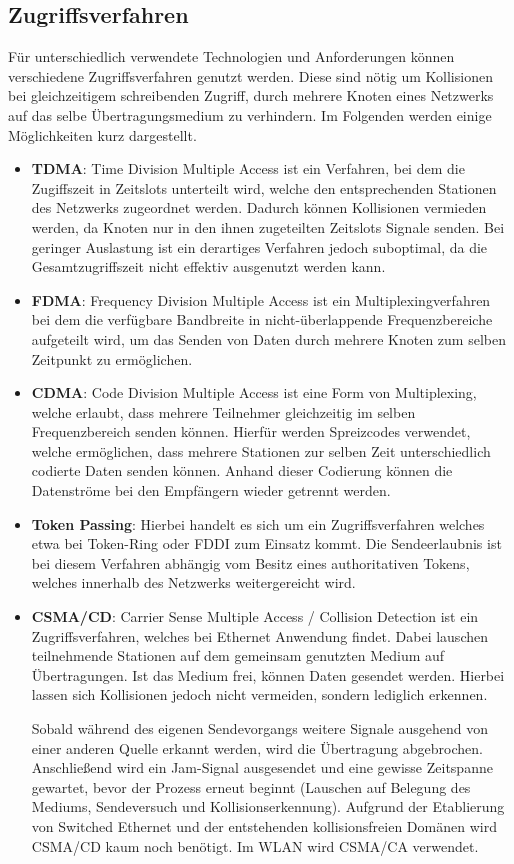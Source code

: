     \subsection{Zugriffsverfahren}
    Für unterschiedlich verwendete Technologien und Anforderungen können verschiedene Zugriffsverfahren genutzt werden. Diese sind nötig um Kollisionen bei gleichzeitigem
    schreibenden Zugriff, durch mehrere Knoten eines Netzwerks auf das selbe Übertragungsmedium zu verhindern. Im Folgenden werden einige Möglichkeiten kurz dargestellt.
        \begin{itemize}
            \item \textbf{TDMA}: Time Division Multiple Access ist ein Verfahren, bei dem die Zugiffszeit in Zeitslots unterteilt wird, welche den entsprechenden
            Stationen des Netzwerks zugeordnet werden. Dadurch können Kollisionen vermieden werden, da Knoten nur in den ihnen zugeteilten Zeitslots Signale 
            senden. Bei geringer Auslastung ist ein derartiges Verfahren jedoch suboptimal, da die Gesamtzugriffszeit nicht effektiv ausgenutzt werden kann.
            \item \textbf{FDMA}: Frequency Division Multiple Access ist ein Multiplexingverfahren bei dem die verfügbare Bandbreite in nicht-überlappende Frequenzbereiche aufgeteilt wird,
            um das Senden von Daten durch mehrere Knoten zum selben Zeitpunkt zu ermöglichen.
            \item \textbf{CDMA}: Code Division Multiple Access ist eine Form von Multiplexing, welche erlaubt, dass mehrere Teilnehmer gleichzeitig im selben Frequenzbereich
            senden können. Hierfür werden Spreizcodes verwendet, welche ermöglichen, dass mehrere Stationen zur selben Zeit unterschiedlich codierte Daten senden können.
            Anhand dieser Codierung können die Datenströme bei den Empfängern wieder getrennt werden.
            \item \textbf{Token Passing}: Hierbei handelt es sich um ein Zugriffsverfahren welches etwa bei Token-Ring oder FDDI zum Einsatz kommt. Die Sendeerlaubnis ist bei diesem
            Verfahren abhängig vom Besitz eines authoritativen Tokens, welches innerhalb des Netzwerks weitergereicht wird.
            \item \textbf{CSMA/CD}: Carrier Sense Multiple Access / Collision Detection ist ein Zugriffsverfahren, welches bei Ethernet Anwendung findet. Dabei lauschen teilnehmende Stationen
            auf dem gemeinsam genutzten Medium auf Übertragungen. Ist das Medium frei, können Daten gesendet werden. Hierbei lassen sich Kollisionen jedoch nicht vermeiden, sondern lediglich 
            erkennen. 
            
            Sobald während des eigenen Sendevorgangs weitere Signale ausgehend von einer anderen Quelle erkannt werden, wird die Übertragung abgebrochen. Anschließend wird ein
            Jam-Signal ausgesendet und eine gewisse Zeitspanne gewartet, bevor der Prozess erneut beginnt (Lauschen auf Belegung des Mediums, Sendeversuch und Kollisionserkennung).
            Aufgrund der Etablierung von Switched Ethernet und der entstehenden kollisionsfreien Domänen wird CSMA/CD kaum noch benötigt. Im WLAN wird CSMA/CA verwendet.
        \end{itemize}
